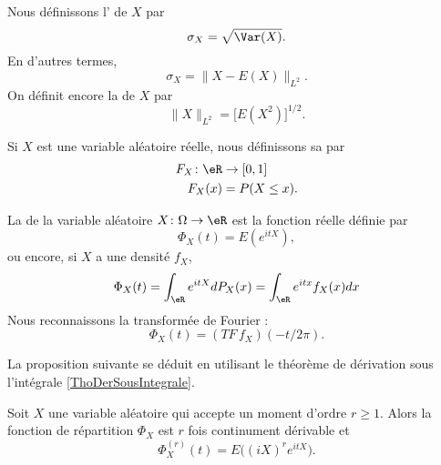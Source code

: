 Nous définissons l' de \( X\) par
\begin{equation}
    \sigma_X=\sqrt{\Var(X)}.
\end{equation}
En d'autres termes,
\begin{equation}
    \sigma_X=\| X-E(X) \|_{L^2}.
\end{equation}
On définit encore la  de \( X\) par
\begin{equation}
    \| X \|_{L^2}=\big[ E(X^2) \big]^{1/2}.
\end{equation}

Si \( X\) est une variable aléatoire réelle, nous définissons sa  par
\begin{equation}
    \begin{aligned}
        F_X\colon \eR&\to \mathopen[ 0 , 1 \mathclose] \\
        F_X(x)&=P(X\leq x). 
    \end{aligned}
\end{equation}


La  de la variable aléatoire \( X\colon \Omega\to \eR\) est la fonction réelle définie par
\begin{equation}
    \Phi_X(t)=E( e^{itX}),
\end{equation}
ou encore, si \( X\) a une densité \( f_X\),
\begin{equation}
    \Phi_X(t)=\int_{\eR} e^{itX}dP_X(x)=\int_{\eR} e^{itx}f_X(x)dx
\end{equation}
Nous reconnaissons la transformée de Fourier :
\begin{equation}
    \Phi_X(t)=(TF\,f_X)(-t/2\pi).
\end{equation}

La proposition suivante se déduit en utilisant le théorème de dérivation sous l'intégrale \ref{ThoDerSousIntegrale}.
\begin{proposition}     \label{PropDerFnCaract}
    Soit $X$ une variable aléatoire qui accepte un moment d'ordre \( r\geq 1\). Alors la fonction de répartition \( \Phi_X\) est \( r\) fois continument dérivable et
    \begin{equation}
        \Phi_X^{(r)}(t)=E\big( (iX)^r e^{itX} \big).
    \end{equation}
\end{proposition}


